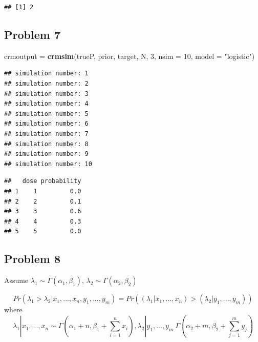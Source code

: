 \documentclass[]{article}
\newenvironment{Shaded}{\begin{snugshade}}{\end{snugshade}}
\newcommand{\DataTypeTok}[1]{\textcolor[rgb]{0.13,0.29,0.53}{#1}}
\newcommand{\DecValTok}[1]{\textcolor[rgb]{0.00,0.00,0.81}{#1}}
\newcommand{\KeywordTok}[1]{\textcolor[rgb]{0.13,0.29,0.53}{\textbf{#1}}}
\newcommand{\NormalTok}[1]{#1}
\newcommand{\OperatorTok}[1]{\textcolor[rgb]{0.81,0.36,0.00}{\textbf{#1}}}
\newcommand{\StringTok}[1]{\textcolor[rgb]{0.31,0.60,0.02}{#1}}
\begin{document}
\begin{verbatim}
## [1] 2
\end{verbatim}

\hypertarget{problem-7}{%
\subsection{Problem 7}\label{problem-7}}

\begin{Shaded}
\begin{Highlighting}[]
\NormalTok{crmoutput =}\StringTok{ }\KeywordTok{crmsim}\NormalTok{(trueP, prior, target, N, }\DecValTok{3}\NormalTok{, }\DataTypeTok{nsim =} \DecValTok{10}\NormalTok{, }\DataTypeTok{model =} \StringTok{"logistic"}\NormalTok{)}
\end{Highlighting}
\end{Shaded}

\begin{verbatim}
## simulation number: 1 
## simulation number: 2 
## simulation number: 3 
## simulation number: 4 
## simulation number: 5 
## simulation number: 6 
## simulation number: 7 
## simulation number: 8 
## simulation number: 9 
## simulation number: 10
\end{verbatim}

\begin{Shaded}
\end{Shaded}

\begin{verbatim}
##   dose probability
## 1    1         0.0
## 2    2         0.1
## 3    3         0.6
## 4    4         0.3
## 5    5         0.0
\end{verbatim}

\hypertarget{problem-8}{%
\subsection{Problem 8}\label{problem-8}}

Assume \(\lambda_1 \sim \Gamma(\alpha_1,\beta_1)\),
\(\lambda_2 \sim \Gamma(\alpha_2,\beta_2)\)

\[Pr(\lambda_1>\lambda_2|x_1,...,x_n,y_1,...,y_m)=Pr((\lambda_1|x_1,...,x_n)>(\lambda_2|y_1,...,y_m))\]
where
\[\lambda_1|x_1,...,x_n \sim \Gamma(\alpha_1+n, \beta_1+\sum_{i=1}^nx_i), \lambda_2|y_1,...,y_m~\Gamma(\alpha_2+m,\beta_2+\sum_{j=1}^my_j)\]
\end{document}
